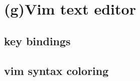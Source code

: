 \chapter{(g)Vim text editor}\label{vim}

\section{key bindings}\label{vimkeys}

\section{vim syntax coloring}\label{vimcolor}
